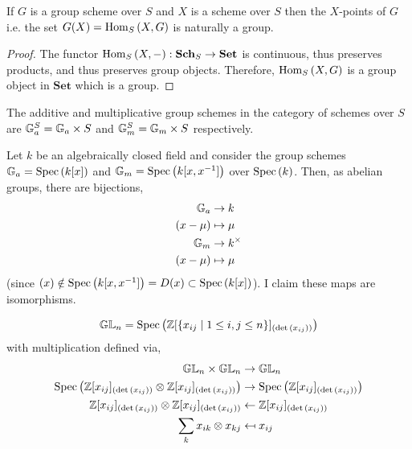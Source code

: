 \documentclass[12pt]{article}
\begin{document}
\begin{lemma}
If $G$ is a group scheme over $S$ and $X$ is a scheme over $S$ then the $X$-points of $G$ i.e. the set $G(X) = \mathrm{Hom}_{S} \left( X, G \right)$ is naturally a group.
\end{lemma}

\begin{proof}
The functor $\mathrm{Hom}_{S} \left( X, - \right) : \mathbf{Sch}_S \to \mathbf{Set}$ is continuous, thus preserves products, and thus preserves group objects. Therefore, $\mathrm{Hom}_{S} \left( X, G \right)$ is a group object in $\mathbf{Set}$ which is a group. 
\end{proof}

\begin{definition}
The additive and multiplicative group schemes in the category of schemes over $S$ are $\mathbb{G}_a^S = \mathbb{G}_a \times S$ and $\mathbb{G}_m^S = \mathbb{G}_m \times S$ respectively. 
\end{definition}

\begin{example}
Let $k$ be an algebraically closed field and consider the group schemes $\mathbb{G}_a = \mathrm{Spec}\left( k[x] \right)$ and $\mathbb{G}_m = \mathrm{Spec}\left( k[x, x^{-1}] \right)$ over $\mathrm{Spec}\left( k \right)$. Then, as abelian groups, there are bijections, 
\begin{align*}
\mathbb{G}_a & \to k 
\\
(x - \mu) & \mapsto \mu
\\
\mathbb{G}_m & \to k^\times
\\
(x - \mu) & \mapsto \mu
\end{align*} 
(since $(x) \notin \mathrm{Spec}\left( k[x, x^{-1}] \right) = D(x) \subset \mathrm{Spec}\left( k[x] \right)$). I claim these maps are isomorphisms. 
\end{example}

\newcommand{\sGL}[1]{\mathbb{GL}_{#1}}

\begin{definition}
\[ \sGL{n} = \Spec{\Z[\{x_{ij}  \mid 1 \le i,j \le n \}]_{(\det{(x_{ij})})}} \]
with multiplication defined via,
\begin{align*}
\sGL{n} \times \sGL{n} & \to \sGL{n}
\\
\Spec{\Z[x_{ij}]_{(\det{(x_{ij})})} \otimes \Z[x_{ij}]_{(\det{(x_{ij})})}} & \to \Spec{\Z[x_{ij}]_{(\det{(x_{ij})})}}
\\
\Z[x_{ij}]_{(\det{(x_{ij})})} \otimes \Z[x_{ij}]_{(\det{(x_{ij})})} & \leftarrow \Z[x_{ij}]_{(\det{(x_{ij})})}
\\
\sum_k x_{ik} \otimes x_{kj} & \mapsfrom x_{ij} 
\end{align*}
\end{definition}
\end{document}
